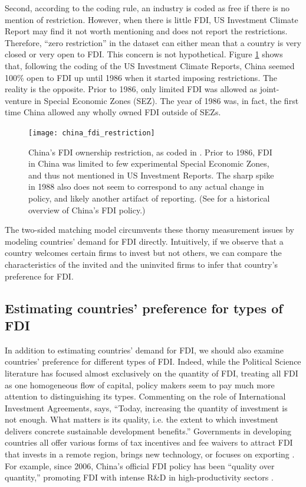 Second, according to the coding rule, an industry is coded as free if there is
no mention of restriction. However, when there is little FDI, US Investment
Climate Report may find it not worth mentioning and does not report the
restrictions. Therefore, ``zero restriction'' in the dataset can either mean
that a country is very closed or very open to FDI. This concern is not
hypothetical. Figure \ref{fig:china_fdi_restriction} shows that, following the
coding of the US Investment Climate Reports, China seemed 100\% open to FDI up
until 1986 when it started imposing restrictions. The reality is the opposite.
Prior to 1986, only limited FDI was allowed as joint-venture in Special Economic
Zones (SEZ). The year of 1986 was, in fact, the first time China allowed any
wholly owned FDI outside of SEZs.

\begin{figure}[tbp] \centering
  \texttt{[image: china\_fdi\_restriction]}
  \caption[China's FDI ownership restriction.]{China's FDI ownership
    restriction, as coded in \citet{Pandya2010}. Prior to 1986, FDI in China was
    limited to few experimental Special Economic Zones, and thus not mentioned
    in US Investment Reports. The sharp spike in 1988 also does not seem to
    correspond to any actual change in policy, and likely another artifact of
    reporting. (See \citet{Zebregs2002} for a historical overview of China's FDI
    policy.)}
  \label{fig:china_fdi_restriction}
\end{figure}

The two-sided matching model circumvents these thorny measurement issues by
modeling countries' demand for FDI directly. Intuitively, if we observe that a
country welcomes certain firms to invest but not others, we can compare the
characteristics of the invited and the uninvited firms to infer that country's
preference for FDI.

\subsection{Estimating countries' preference for types of FDI}

In addition to estimating countries' demand for FDI, we should also examine
countries' preference for different types of FDI. Indeed, while the Political
Science literature has focused almost exclusively on the quantity of FDI,
treating all FDI as one homogeneous flow of capital, policy makers seem to pay
much more attention to distinguishing its types. Commenting on the role of
International Investment Agreements, \citet{UNCTAD2015} says, ``Today,
increasing the quantity of investment is not enough. What matters is its
quality, i.e. the extent to which investment delivers concrete sustainable
development benefits.'' Governments in developing countries all offer various
forms of tax incentives and fee waivers to attract FDI that invests in a remote
region, brings new technology, or focuses on exporting \citep{Ricupero2000}. For
example, since 2006, China's official FDI policy has been ``quality over
quantity,'' promoting FDI with intense R\&D in high-productivity sectors
\citep{Guangzhou2011}.

